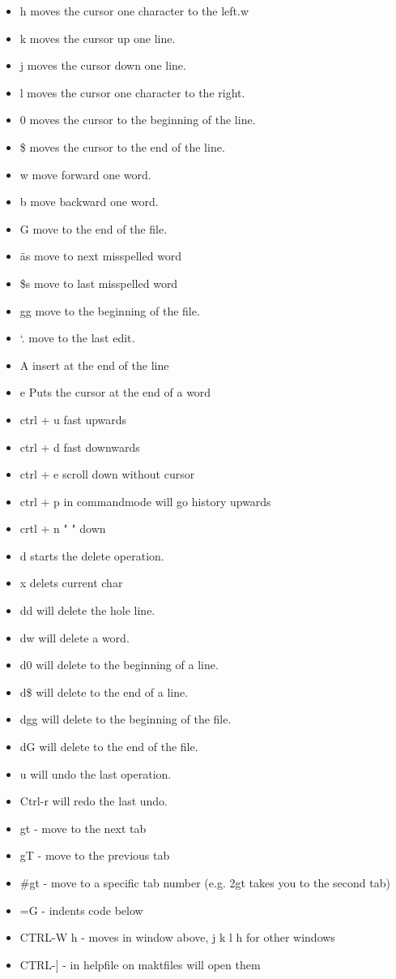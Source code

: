 \documentclass[12pt]{article}
\begin{document}
\begin{itemize}

    \item h moves the cursor one character to the left.w
    \item k moves the cursor up one line.
    \item j moves the cursor down one line.
    \item l moves the cursor one character to the right.
    \item 0 moves the cursor to the beginning of the line.
    \item \$ moves the cursor to the end of the line.
    \item w move forward one word.
    \item b move backward one word.
    \item G move to the end of the file.
    \item äs move to next misspelled word
    \item \$s move to last misspelled word
    \item gg move to the beginning of the file.
    \item `. move to the last edit.
    \item A insert at the end of the line
    \item e  Puts the cursor at the end of a word
    \item ctrl + u  fast upwards
    \item ctrl + d  fast downwards
    \item ctrl + e  scroll down without cursor
    \item ctrl + p in commandmode will go history upwards
    \item crtl + n "                            " down
    \item d starts the delete operation.
    \item x delets current char
    \item dd will delete the hole line.
    \item dw will delete a word.
    \item d0 will delete to the beginning of a line.
    \item d\$ will delete to the end of a line.
    \item dgg will delete to the beginning of the file.
    \item dG will delete to the end of the file.
    \item u will undo the last operation.
    \item Ctrl-r will redo the last undo. \\
    \item gt - move to the next tab
    \item gT - move to the previous tab
    \item \#gt - move to a specific tab number (e.g. 2gt takes you to the second tab)
    \item =G - indents code below
    \item CTRL-W h - moves in window above, j k l h for other windows
    \item CTRL-] - in helpfile on maktfiles will open them


\end{itemize}
\end{document}
